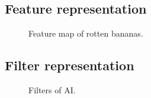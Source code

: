 \documentclass[a4paper,oneside,11pt]{book}
\begin{document}
\subsection{Feature representation}
\begin{figure}[H]
    \centering
    \caption{Feature map of rotten bananas.}
\end{figure}
\subsection{Filter representation}
\begin{figure}[H]
    \centering
    \caption{Filters of AI.}
\end{figure}
\end{document}
